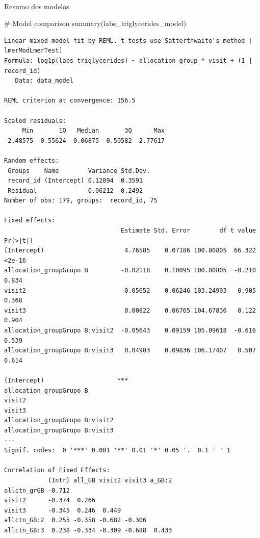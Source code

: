 \documentclass[
  letterpaper,
  DIV=11,
  numbers=noendperiod]{scrartcl}
\makeatletter
\let\oldparagraph\paragraph
\renewcommand{\paragraph}{
    \@ifstar
      \xxxParagraphStar
      \xxxParagraphNoStar
  }
\newcommand{\xxxParagraphStar}[1]{\oldparagraph*{#1}\mbox{}}
\newcommand{\xxxParagraphNoStar}[1]{\oldparagraph{#1}\mbox{}}
\newenvironment{Shaded}{\begin{snugshade}}{\end{snugshade}}
\newcommand{\CommentTok}[1]{\textcolor[rgb]{0.37,0.37,0.37}{#1}}
\newcommand{\FunctionTok}[1]{\textcolor[rgb]{0.28,0.35,0.67}{#1}}
\newcommand{\NormalTok}[1]{\textcolor[rgb]{0.00,0.23,0.31}{#1}}
\makeatother
\begin{document}
\paragraph{Resumo dos modelos}\label{resumo-dos-modelos-7}

\begin{Shaded}
\begin{Highlighting}[]
\CommentTok{\# Model comparison}
\FunctionTok{summary}\NormalTok{(labs\_triglycerides\_model)}
\end{Highlighting}
\end{Shaded}

\begin{verbatim}
Linear mixed model fit by REML. t-tests use Satterthwaite's method [
lmerModLmerTest]
Formula: log1p(labs_triglycerides) ~ allocation_group * visit + (1 | record_id)
   Data: data_model

REML criterion at convergence: 156.5

Scaled residuals: 
     Min       1Q   Median       3Q      Max 
-2.48575 -0.55624 -0.06875  0.50582  2.77617 

Random effects:
 Groups    Name        Variance Std.Dev.
 record_id (Intercept) 0.12894  0.3591  
 Residual              0.06212  0.2492  
Number of obs: 179, groups:  record_id, 75

Fixed effects:
                                Estimate Std. Error        df t value Pr(>|t|)
(Intercept)                      4.76585    0.07186 100.80805  66.322   <2e-16
allocation_groupGrupo B         -0.02118    0.10095 100.80805  -0.210    0.834
visit2                           0.05652    0.06246 103.24903   0.905    0.368
visit3                           0.00822    0.06765 104.67836   0.122    0.904
allocation_groupGrupo B:visit2  -0.05643    0.09159 105.09618  -0.616    0.539
allocation_groupGrupo B:visit3   0.04983    0.09836 106.17407   0.507    0.614
                                  
(Intercept)                    ***
allocation_groupGrupo B           
visit2                            
visit3                            
allocation_groupGrupo B:visit2    
allocation_groupGrupo B:visit3    
---
Signif. codes:  0 '***' 0.001 '**' 0.01 '*' 0.05 '.' 0.1 ' ' 1

Correlation of Fixed Effects:
            (Intr) all_GB visit2 visit3 a_GB:2
allctn_grGB -0.712                            
visit2      -0.374  0.266                     
visit3      -0.345  0.246  0.449              
allctn_GB:2  0.255 -0.358 -0.682 -0.306       
allctn_GB:3  0.238 -0.334 -0.309 -0.688  0.433
\end{verbatim}
\end{document}
